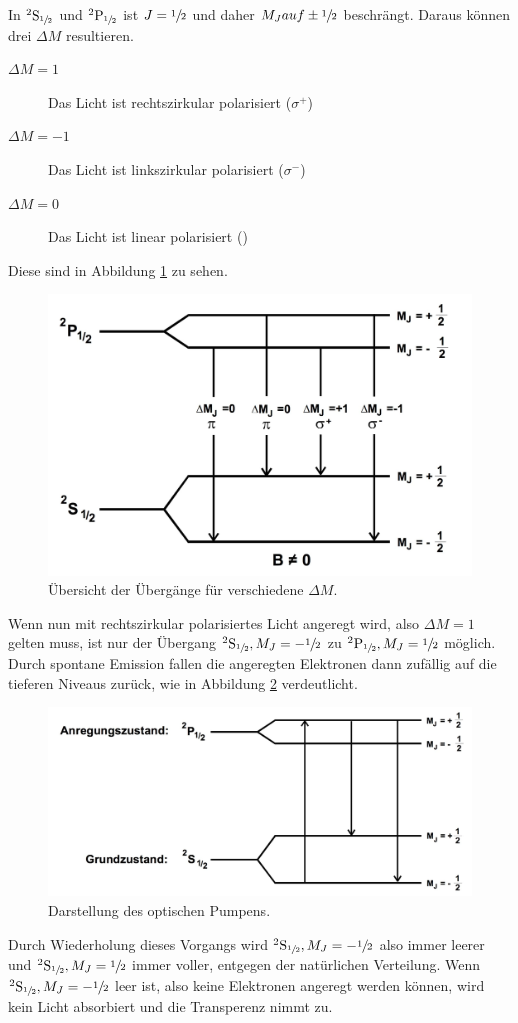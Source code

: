 In ${}^2\mathrm{S}_{\sfrac{1}{2}}$ und ${}^2\mathrm{P}_{\sfrac{1}{2}}$ ist $J={\sfrac{1}{2}}$ und daher $M_J auf \pm \sfrac{1}{2}$ beschrängt. Daraus können drei $\Delta M$ resultieren.
\begin{description}
	\item[$\Delta M=1$] Das Licht ist rechtszirkular polarisiert ($\sigma^{+}$)
	\item[$\Delta M=-1$] Das Licht ist linkszirkular polarisiert ($\sigma^{-}$)
	\item[$\Delta M=0$] Das Licht ist linear polarisiert (\pi)
\end{description}
Diese sind in Abbildung \ref{fig:ubergang} zu sehen.
\begin{figure}
	\centering
	\includegraphics[width=0.8\linewidth]{img/ubergange.jpg}
	\caption{Übersicht der Übergänge für verschiedene $\Delta M$.}
	\label{fig:ubergang}
\end{figure}
Wenn nun mit rechtszirkular polarisiertes Licht angeregt wird, also $\Delta M=1$ gelten muss, ist nur der Übergang ${}^2\mathrm{S}_{\sfrac{1}{2}}, M_J=-\sfrac{1}{2}$ zu ${}^2\mathrm{P}_{\sfrac{1}{2}}, M_J=\sfrac{1}{2}$ möglich. Durch spontane Emission fallen die angeregten Elektronen dann zufällig auf die tieferen Niveaus zurück, wie in Abbildung \ref{fig:optPumpen} verdeutlicht.
\begin{figure}
	\centering
	\includegraphics[width=0.8\linewidth]{img/optPumpen.jpg}
	\caption{Darstellung des optischen Pumpens.}
	\label{fig:optPumpen}
\end{figure}
Durch Wiederholung dieses Vorgangs wird ${}^2\mathrm{S}_{\sfrac{1}{2}}, M_J=-\sfrac{1}{2}$ also immer leerer und ${}^2\mathrm{S}_{\sfrac{1}{2}},M_J=\sfrac{1}{2}$ immer voller, entgegen der natürlichen Verteilung. Wenn  ${}^2\mathrm{S}_{\sfrac{1}{2}}, M_J=-\sfrac{1}{2}$ leer ist, also keine Elektronen angeregt werden können, wird kein Licht absorbiert und die Transperenz nimmt zu.
